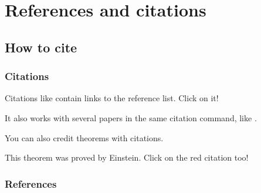 \documentclass{beamer}
\begin{document}
\section{References and citations}

\subsection{How to cite}

\begin{frame}
    \frametitle{Citations}

    Citations like \cite{knuth-fa} contain links to the reference list. Click on it!

    It also works with several papers in the same citation command, like \cite{dirac,knuthwebsite}.

    You can also credit theorems with citations.

    \begin{theorem}
        This theorem was proved by Einstein. Click on the red citation too!
    \end{theorem}

\end{frame}



\begin{frame}
    \frametitle{References}

    
    

\end{frame}
\end{document}
